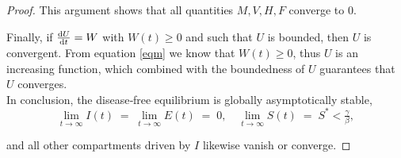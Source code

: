\documentclass[11pt]{article}
\begin{document}
\begin{proof}
This argument shows that all quantities $M, V, H, F$ converge to $0$.  

Finally, if $\dv{U}{t} = W$ with $W(t)\ge0$ and such that $U$ is bounded,  then $U$ is convergent. From equation \ref{eqm} we know that $W(t)\geq 0$, thus $U$ is an increasing function, which combined with the boundedness of $U$ 
guarantees that $U$ converges. \\

In conclusion,  the disease‐free equilibrium is globally asymptotically stable,
$$
   \lim_{t\to\infty}I(t)\;=\;\lim_{t\to\infty}E(t)\;=\;0,
   \quad
   \lim_{t\to\infty}S(t)\;=\;S^*<\tfrac{\gamma}{\beta},
 $$ 

and all other compartments driven by $I$ likewise vanish or converge.
\end{proof}
\end{document}
